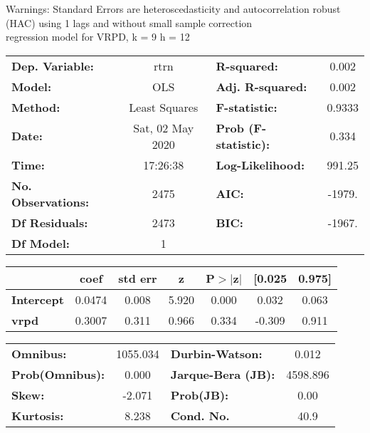 Warnings: \newline
 [1] Standard Errors are heteroscedasticity and autocorrelation robust (HAC) using 1 lags and without small sample correction\\ 

regression model for VRPD, k = 9 h = 12\begin{center}
\begin{tabular}{lclc}
\toprule
\textbf{Dep. Variable:}    &       rtrn       & \textbf{  R-squared:         } &     0.002   \\
\textbf{Model:}            &       OLS        & \textbf{  Adj. R-squared:    } &     0.002   \\
\textbf{Method:}           &  Least Squares   & \textbf{  F-statistic:       } &    0.9333   \\
\textbf{Date:}             & Sat, 02 May 2020 & \textbf{  Prob (F-statistic):} &    0.334    \\
\textbf{Time:}             &     17:26:38     & \textbf{  Log-Likelihood:    } &    991.25   \\
\textbf{No. Observations:} &        2475      & \textbf{  AIC:               } &    -1979.   \\
\textbf{Df Residuals:}     &        2473      & \textbf{  BIC:               } &    -1967.   \\
\textbf{Df Model:}         &           1      & \textbf{                     } &             \\
\bottomrule
\end{tabular}
\begin{tabular}{lcccccc}
                   & \textbf{coef} & \textbf{std err} & \textbf{z} & \textbf{P$> |$z$|$} & \textbf{[0.025} & \textbf{0.975]}  \\
\midrule
\textbf{Intercept} &       0.0474  &        0.008     &     5.920  &         0.000        &        0.032    &        0.063     \\
\textbf{vrpd}      &       0.3007  &        0.311     &     0.966  &         0.334        &       -0.309    &        0.911     \\
\bottomrule
\end{tabular}
\begin{tabular}{lclc}
\textbf{Omnibus:}       & 1055.034 & \textbf{  Durbin-Watson:     } &    0.012  \\
\textbf{Prob(Omnibus):} &   0.000  & \textbf{  Jarque-Bera (JB):  } & 4598.896  \\
\textbf{Skew:}          &  -2.071  & \textbf{  Prob(JB):          } &     0.00  \\
\textbf{Kurtosis:}      &   8.238  & \textbf{  Cond. No.          } &     40.9  \\
\bottomrule
\end{tabular}
\end{center}


